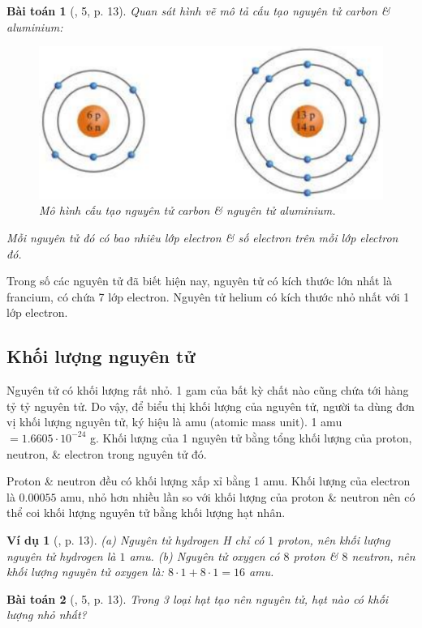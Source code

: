 \documentclass{article}
\newtheorem{baitoan}{Bài toán}
\newtheorem{vidu}{Ví dụ}
\begin{document}
\begin{baitoan}[\cite{SGK_KHTN_7_Canh_Dieu}, 5, p. 13]
	Quan sát hình vẽ mô tả cấu tạo nguyên tử carbon \& aluminium:
	\begin{figure}[H]
		\centering
		\includegraphics[scale=0.4]{carbon_aluminium}
		\caption{Mô hình cấu tạo nguyên tử carbon \& nguyên tử aluminium.}
	\end{figure}
	\noindent Mỗi nguyên tử đó có bao nhiêu lớp electron \& số electron trên mỗi lớp electron đó.
\end{baitoan}
Trong số các nguyên tử đã biết hiện nay, nguyên tử có kích thước lớn nhất là francium, có chứa 7 lớp electron. Nguyên tử helium có kích thước nhỏ nhất với 1 lớp electron.

\subsection{Khối lượng nguyên tử}
Nguyên tử có khối lượng rất nhỏ. 1 gam của bất kỳ chất nào cũng chứa tới hàng tỷ tỷ nguyên tử. Do vậy, để biểu thị khối lượng của nguyên tử, người ta dùng đơn vị khối lượng nguyên tử, ký hiệu là amu (atomic mass unit). 1 amu $= 1.6605\cdot10^{-24}$ g. Khối lượng của 1 nguyên tử bằng tổng khối lượng của proton, neutron, \& electron trong nguyên tử đó.

Proton \& neutron đều có khối lượng xấp xỉ bằng 1 amu. Khối lượng của electron là $0.00055$ amu, nhỏ hơn nhiều lần so với khối lượng của proton \& neutron nên có thể coi khối lượng nguyên tử bằng khối lượng hạt nhân.

\begin{vidu}[\cite{SGK_KHTN_7_Canh_Dieu}, p. 13]
	(a) Nguyên tử hydrogen \emph{H} chỉ có $1$ proton, nên khối lượng nguyên tử hydrogen là $1$ amu. (b) Nguyên tử oxygen có $8$ proton \& $8$ neutron, nên khối lượng nguyên tử oxygen là: $8\cdot1 + 8\cdot1 = 16$ amu.
\end{vidu}

\begin{baitoan}[\cite{SGK_KHTN_7_Canh_Dieu}, 5, p. 13]
	Trong 3 loại hạt tạo nên nguyên tử, hạt nào có khối lượng nhỏ nhất?
\end{baitoan}
\end{document}
